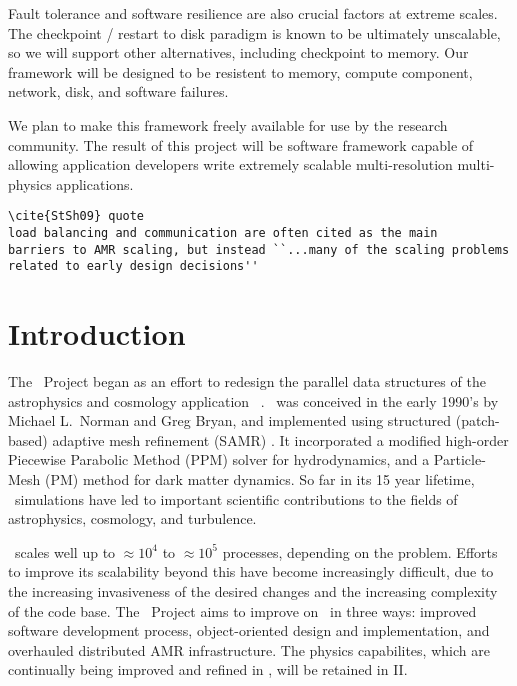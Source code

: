 \documentclass[10pt]{article}
\begin{document}
 Fault tolerance and software
resilience are also crucial factors at extreme scales.  The checkpoint
/ restart to disk paradigm is known to be ultimately unscalable, so we
will support other alternatives, including checkpoint to memory.  Our
framework will be designed to be resistent to memory, compute
component, network, disk, and software failures.

%
We plan to make this framework freely available for use by the
research community.  The result of this project will be software
framework capable of allowing application developers write extremely
scalable multi-resolution multi-physics applications.

\begin{verbatim}
\cite{StSh09} quote
load balancing and communication are often cited as the main
barriers to AMR scaling, but instead ``...many of the scaling problems related to early design decisions''
\end{verbatim}
\section{Introduction} \label{s:intro}


The \cello\ Project began as an effort to redesign the parallel data
structures of the astrophysics and cosmology application \enzo\
\cite{OsBr04}.  \enzo\ was conceived in the early 1990's by Michael
L.~Norman and Greg Bryan, and implemented using structured
(patch-based) adaptive mesh refinement (SAMR) \cite{BeCo89}.  It
incorporated a modified high-order Piecewise Parabolic Method (PPM)
solver \cite{WoCo84b} for hydrodynamics, and a Particle-Mesh (PM)
method \cite{@@@PM} for dark matter dynamics.  So far in its 15 year
lifetime, \enzo\ simulations have led to important scientific
contributions to the fields of astrophysics, cosmology, and
turbulence.

\enzo\ scales well up to $\approx 10^4$ to $\approx 10^5$ processes,
depending on the problem.  Efforts to improve its scalability beyond
this have become increasingly difficult, due to the increasing
invasiveness of the desired changes and the increasing complexity of
the code base.  The \cello\ Project aims to improve on \enzo\ in three
ways: improved software development process, object-oriented design
and implementation, and overhauled distributed AMR infrastructure.
The physics capabilites, which are continually being improved and
refined in \enzo, will be retained in \enzo II.
\end{document}
